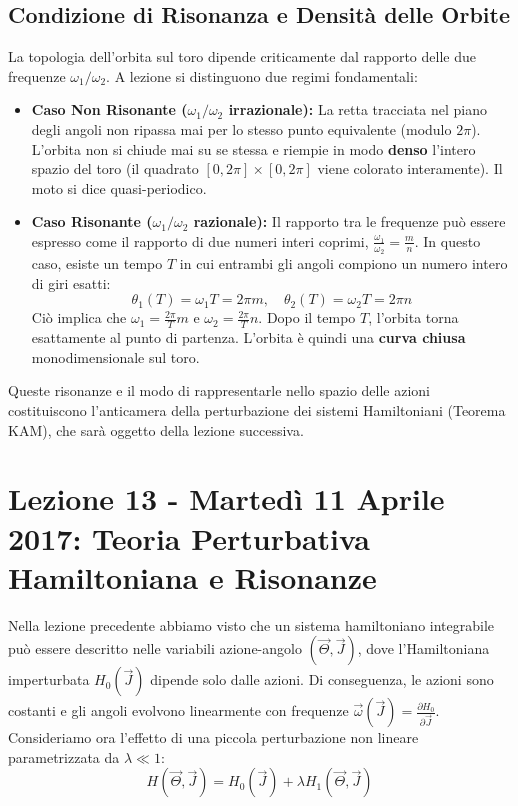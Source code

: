 \documentclass[12pt,a4paper]{article}
\begin{document}
\subsection{Condizione di Risonanza e Densità delle Orbite}
La topologia dell'orbita sul toro dipende criticamente dal rapporto delle due frequenze $\omega_1/\omega_2$. A lezione si distinguono due regimi fondamentali:

\begin{itemize}
    \item \textbf{Caso Non Risonante ($\omega_1/\omega_2$ irrazionale):} La retta tracciata nel piano degli angoli non ripassa mai per lo stesso punto equivalente (modulo $2\pi$). L'orbita non si chiude mai su se stessa e riempie in modo \textbf{denso} l'intero spazio del toro (il quadrato $[0,2\pi] \times [0,2\pi]$ viene colorato interamente). Il moto si dice quasi-periodico.
    
    \item \textbf{Caso Risonante ($\omega_1/\omega_2$ razionale):} Il rapporto tra le frequenze può essere espresso come il rapporto di due numeri interi coprimi, $\frac{\omega_1}{\omega_2} = \frac{m}{n}$. 
    In questo caso, esiste un tempo $T$ in cui entrambi gli angoli compiono un numero intero di giri esatti:
    \begin{equation}
    \theta_1(T) = \omega_1 T = 2\pi m, \quad \theta_2(T) = \omega_2 T = 2\pi n
    \end{equation}
    Ciò implica che $\omega_1 = \frac{2\pi}{T}m$ e $\omega_2 = \frac{2\pi}{T}n$. Dopo il tempo $T$, l'orbita torna esattamente al punto di partenza. L'orbita è quindi una \textbf{curva chiusa} monodimensionale sul toro. 
\end{itemize}

Queste risonanze e il modo di rappresentarle nello spazio delle azioni costituiscono l'anticamera della perturbazione dei sistemi Hamiltoniani (Teorema KAM), che sarà oggetto della lezione successiva.

\newpage

\section{Lezione 13 - Martedì 11 Aprile 2017: Teoria Perturbativa Hamiltoniana e Risonanze}

Nella lezione precedente abbiamo visto che un sistema hamiltoniano integrabile può essere descritto nelle variabili azione-angolo $(\vec{\Theta}, \vec{J})$, dove l'Hamiltoniana imperturbata $H_0(\vec{J})$ dipende solo dalle azioni. Di conseguenza, le azioni sono costanti e gli angoli evolvono linearmente con frequenze $\vec{\omega}(\vec{J}) = \frac{\partial H_0}{\partial \vec{J}}$.
Consideriamo ora l'effetto di una piccola perturbazione non lineare parametrizzata da $\lambda \ll 1$:
\begin{equation}
H(\vec{\Theta}, \vec{J}) = H_0(\vec{J}) + \lambda H_1(\vec{\Theta}, \vec{J})
\end{equation}
\end{document}
